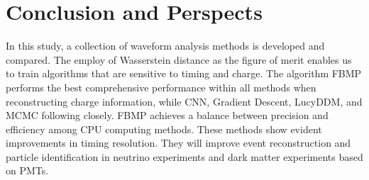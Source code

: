 \section{Conclusion and Perspects} %
\label{sec:conclusion}

In this study, a collection of waveform analysis methods is developed and compared. The employ of Wasserstein distance as the figure of merit enables us to train algorithms that are sensitive to timing and charge. The algorithm FBMP performs the best comprehensive performance within all methods when reconstructing charge information, while CNN, Gradient Descent, LucyDDM, and MCMC following closely. FBMP achieves a balance between precision and efficiency among CPU computing methods. These methods show evident improvements in timing resolution. They will improve event reconstruction and particle identification in neutrino experiments and dark matter experiments based on PMTs. 


